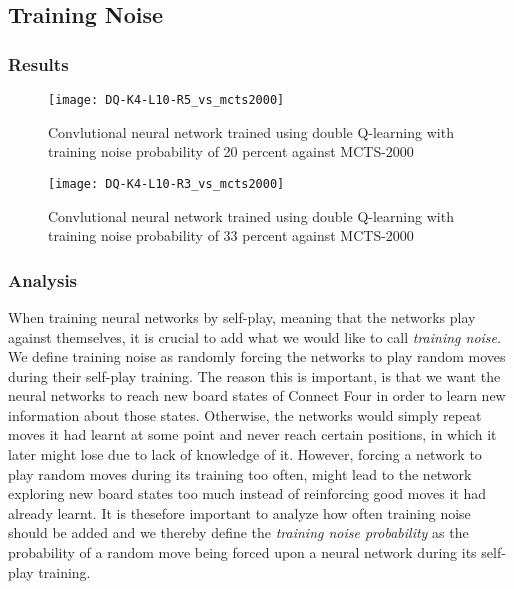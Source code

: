 \documentclass[titlepage]{article}
\begin{document}
\newpage

\subsection{Training Noise}

\subsubsection{Results}

\vskip -0.7cm

\begin{figure}[h]
    \center
    \texttt{[image: DQ-K4-L10-R5\_vs\_mcts2000]}
    \caption{\scriptsize Convlutional neural network trained using double Q-learning with training noise probability of 20 percent against MCTS-2000}
\end{figure}

\vskip 0.2cm

\begin{figure}[h]
    \center
    \texttt{[image: DQ-K4-L10-R3\_vs\_mcts2000]}
    \caption{\scriptsize Convlutional neural network trained using double Q-learning with training noise probability of \scalebox{0.7}{$(\approx)$} 33 percent against MCTS-2000}
\end{figure}

\newpage

\subsubsection{Analysis}

\vskip 0.2cm

\noindent
When training neural networks by self-play, meaning that the networks play against themselves, it is crucial to add what we would like to call \emph{training noise}. We define training noise as randomly forcing the networks to play random moves during their self-play training. The reason this is important, is that we want the neural networks to reach new board states of Connect Four in order to learn new information about those states. Otherwise, the networks would simply repeat moves it had learnt at some point and never reach certain positions, in which it later might lose due to lack of knowledge of it. However, forcing a network to play random moves during its training too often, might lead to the network exploring new board states too much instead of reinforcing good moves it had already learnt. It is thesefore important to analyze how often training noise should be added and we thereby define the \emph{training noise probability} as the probability of a random move being forced upon a neural network during its self-play training. 
\end{document}
